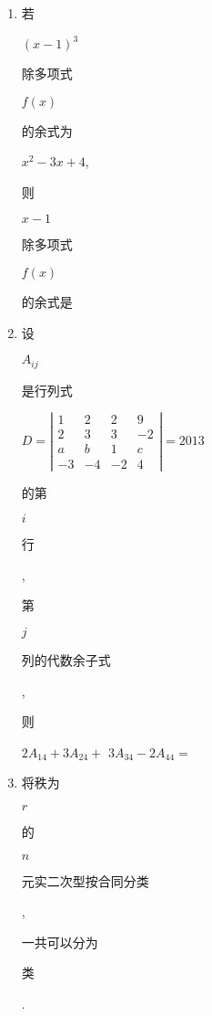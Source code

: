 \documentclass[10pt]{article}
\begin{document}
\begin{enumerate}
  \item \begin{CJK}{UTF8}{mj}若\end{CJK} $(x-1)^{3}$ \begin{CJK}{UTF8}{mj}除多项式\end{CJK} $f(x)$ \begin{CJK}{UTF8}{mj}的余式为\end{CJK} $x^{2}-3 x+4$, \begin{CJK}{UTF8}{mj}则\end{CJK} $x-1$ \begin{CJK}{UTF8}{mj}除多项式\end{CJK} $f(x)$ \begin{CJK}{UTF8}{mj}的余式是\end{CJK}

  \item \begin{CJK}{UTF8}{mj}设\end{CJK} $A_{i j}$ \begin{CJK}{UTF8}{mj}是行列式\end{CJK} $D=\left|\begin{array}{cccc}1 & 2 & 2 & 9 \\ 2 & 3 & 3 & -2 \\ a & b & 1 & c \\ -3 & -4 & -2 & 4\end{array}\right|=2013$ \begin{CJK}{UTF8}{mj}的第\end{CJK} $i$ \begin{CJK}{UTF8}{mj}行\end{CJK}, \begin{CJK}{UTF8}{mj}第\end{CJK} $j$ \begin{CJK}{UTF8}{mj}列的代数余子式\end{CJK}, \begin{CJK}{UTF8}{mj}则\end{CJK} $2 A_{14}+3 A_{24}+$ $3 A_{34}-2 A_{44}=$

  \item \begin{CJK}{UTF8}{mj}将秩为\end{CJK} $r$ \begin{CJK}{UTF8}{mj}的\end{CJK} $n$ \begin{CJK}{UTF8}{mj}元实二次型按合同分类\end{CJK}, \begin{CJK}{UTF8}{mj}一共可以分为\end{CJK} \begin{CJK}{UTF8}{mj}类\end{CJK}.


\end{enumerate}
\end{document}
